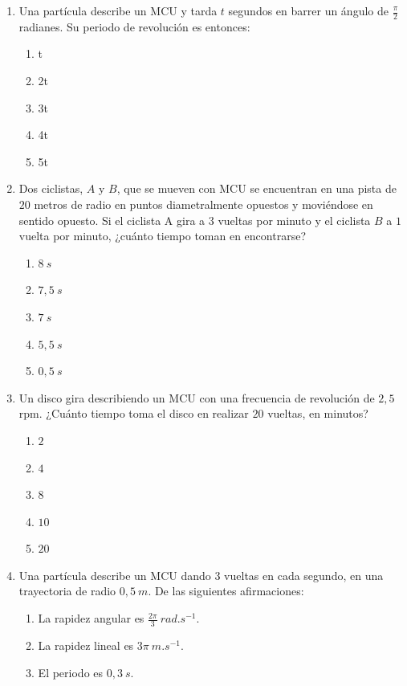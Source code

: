\documentclass[letterpaper]{article}
\begin{document}
\begin{enumerate}
\item Una partícula describe un MCU y tarda $t$ segundos en barrer un ángulo de $\frac\pi2$ radianes. Su periodo de revolución es entonces:
\begin{enumerate}[label=\Alph*)]
 \item t
 \item 2t
 \item 3t
 \item 4t
 \item 5t
\end{enumerate}

\item Dos ciclistas, $A$ y $B$, que se mueven con MCU se encuentran en una pista de $20$ metros
de radio en puntos diametralmente opuestos y moviéndose en sentido opuesto. Si el
ciclista A gira a $3$ vueltas por minuto y el ciclista $B$ a $1$ vuelta por minuto, ¿cuánto tiempo toman en encontrarse?
\begin{enumerate}[label=\Alph*)]
\item $8\ \si{s}$
\item $7,5\ \si{s}$
\item $7\ \si{s}$
\item $5,5\ \si{s}$
\item $0,5\ \si{s}$
\end{enumerate}

\item Un disco gira describiendo un MCU con una frecuencia de revolución de $2,5$ \si{rpm}. ¿Cuánto tiempo toma el disco en realizar $20$ vueltas, en minutos?
\begin{enumerate}[label=\Alph*)]
\item $2$
\item $4$
\item $8$
\item $10$
\item $20$
\end{enumerate}

\item Una partícula describe un MCU dando $3$ vueltas en cada segundo, en una trayectoria de
radio $0,5\ \si{m}$. De las siguientes afirmaciones:
\begin{enumerate}[label=\Roman*)]
\item La rapidez angular es $\frac{2\pi}{3}\ \si{rad.s^{-1}}$.
\item La rapidez lineal es $3\pi\ \si{m.s^{-1}}$.
\item El periodo es $0,3\ \si{s}$.
\end{enumerate}


\end{enumerate}
\end{document}
